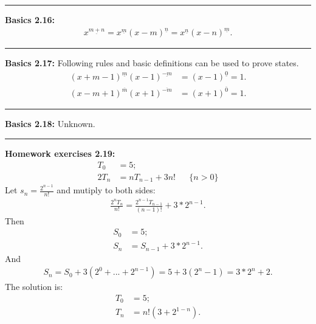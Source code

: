 \documentclass{article}
\begin{document}
\noindent\rule{\textwidth}{0.4pt}
\textbf{Basics 2.16:}
\begin{align}
x^{\underline {m+n}} = x^{\underline m}(x-m)^{\underline n} = x^{\underline n}(x-n)^{\underline m}.
\end{align}

\noindent\rule{\textwidth}{0.4pt}
\textbf{Basics 2.17:}
Following rules and basic definitions can be used to prove states.
\begin{align}
(x+m-1)^{\underline m} (x-1)^{\underline {-m}} &= (x-1)^{\underline 0} = 1.\\
(x-m+1)^{\overline m} (x+1)^{\overline {-m}} &= (x+1)^{\overline 0} = 1.
\end{align}



\noindent\rule{\textwidth}{0.4pt}
\textbf{Basics 2.18:}
Unknown.

\noindent\rule{\textwidth}{0.4pt}
\textbf{Homework exercises 2.19:}
\begin{align}
T_0 &= 5;\\
2T_n &= nT_{n-1} + 3n! && \{ n > 0\}
\end{align}
Let $s_n = \frac{2^{n-1}}{n!}$ and mutiply to both sides:
\begin{align}
\frac{2^nT_n}{n!} = \frac{2^{n-1}T_{n-1}}{(n-1)!} + 3 *2^{n-1}.
\end{align}
Then
\begin{align}
S_0 &= 5; \\
S_n &= S_{n-1} + 3 * 2^{n-1}. 
\end{align}
And
\begin{align}
S_n = S_0 + 3(2^0 + ... + 2^{n-1}) = 5 + 3(2^n - 1) = 3*2^n + 2.
\end{align}
The solution is:
\begin{align}
T_0 &= 5;\\
T_n &= n!(3 + 2^{1-n}).
\end{align}
\end{document}
